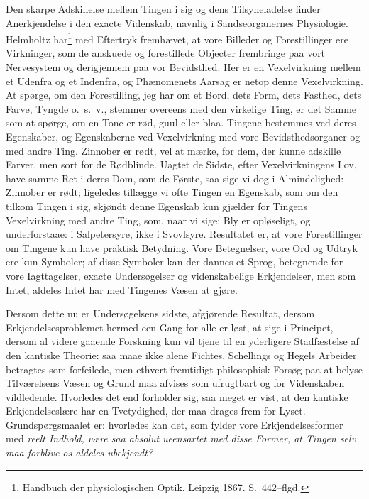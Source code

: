 \documentclass[12pt]{article}
\newcommand{\opage}[1]{\marginnote{\footnotesize\textit{[#1]}}}
\begin{document}
Den skarpe Adskillelse mellem Tingen i sig og dens
Tilsyneladelse finder Anerkjendelse i den exacte Videnskab, navn\-lig
i Sandseorganernes Physiologie. Helmholtz har\footnote{Handbuch
der physiologischen Optik. Leipzig 1867. S.~442--flgd.} med
Eftertryk fremhævet, at vore Billeder og Forestillinger ere
Virkninger, som de anskuede og forestillede Objecter frembringe paa
vort Nervesystem og derigjennem paa vor Bevidsthed. Her er en
Vexelvirkning mellem et Udenfra og et Indenfra, og Phænomenets
Aarsag er netop denne Vexelvirkning. At spørge, om den
Forestilling, jeg har om et Bord, dets Form, dets Fasthed, dets
\opage{9} Farve, Tyngde o.\ s.\ v., stemmer overeens med den virkelige
Ting, er det Samme som at spørge, om en Tone er rød, guul
eller blaa. Tingene bestemmes ved deres Egenskaber, og
Egenskaberne ved Vexelvirkning med vore Bevidsthedsorganer
og med andre Ting. Zinnober er rødt, vel at mærke, for dem,
der kunne adskille Farver, men sort for de Rødblinde. Uagtet
de Sidste, efter Vexelvirkningens Lov, have samme Ret i deres
Dom, som de Første, saa sige vi dog i Almindelighed: Zinno\-ber
er rødt; ligeledes tillægge vi ofte Tingen en Egenskab, som
om den tilkom Tingen i sig, skjøndt denne Egenskab kun gjæl\-der
for Tingens Vexelvirkning med andre Ting, som, naar vi
sige: Bly er opløseligt, og underforstaae: i Salpetersyre, ikke i
Svovlsyre. Resultatet er, at vore Forestillinger om Tingene kun
have praktisk Betydning. Vore Betegnelser, vore Ord og Ud\-tryk
ere kun Symboler; af disse Symboler kan der dannes et
Sprog, betegnende for vore Iagttagelser, exacte Undersøgelser
og videnskabelige Erkjendelser, men som Intet, aldeles Intet
har med Tingenes Væsen at gjøre.

Dersom dette nu er Undersøgelsens sidste, afgjørende
Resultat, dersom Erkjendelsesproblemet hermed een Gang for alle
er løst, at sige i Principet, dersom al videre gaaende Forskning
kun vil tjene til en yderligere Stadfæstelse af den kantiske
Theorie: saa maae ikke alene Fichtes, Schellings og Hegels
Arbeider betragtes som forfeilede, men ethvert fremtidigt
philosophisk Forsøg paa at belyse Tilværelsens Væsen og Grund maa
afvises som ufrugtbart og for Videnskaben vildledende.
Hvorledes det end forholder sig, saa meget er vist, at den kantiske
Erkjendelseslære har en Tvetydighed, der maa drages frem for
Lyset. Grundspørgsmaalet er: hvorledes kan det, som fylder
vore Erkjendelsesformer med \emph{reelt Indhold, være saa absolut
ueensartet med disse Former, at Tingen selv maa forblive os
aldeles ubekjendt?}
\end{document}
